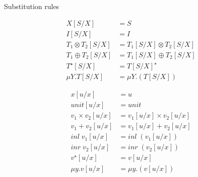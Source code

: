 \documentclass[10pt]{jsarticle}
\begin{document}
\begin{itembox}[c]{Substitution rules}
  \begin{minipage}{0.5\hsize}
    \begin{align*}
      X[S/X] &= S \\
      I[S/X] &= I \\
      T_1\otimes{}T_2[S/X] &= T_1[S/X]\otimes{}T_2[S/X] \\
      T_1\oplus{}T_2[S/X] &= T_1[S/X]\oplus{}T_2[S/X] \\
      T^\star[S/X] &= T[S/X]^\star \\
      \mu{Y}.T[S/X] &= \mu{Y}.(T[S/X])
    \end{align*}
  \end{minipage}
  \begin{minipage}{0.5\hsize}
    \begin{align*}
    x[u/x] &= u \\
    unit[u/x] &= unit \\
    v_1\times{}v_2[u/x] &= v_1[u/x]\times{}v_2[u/x] \\
    v_1+v_2[u/x] &= v_1[u/x]+v_2[u/x] \\
    inl\;v_1[u/x] &= inl\;(v_1[u/x]) \\
    inr\;v_2[u/x] &= inr\;(v_2[u/x]) \\
    v^\star[u/x] &= v[u/x] \\
    \mu{y}.v[u/x] &= \mu{y}.(v[u/x])
    \end{align*}
  \end{minipage}
\end{itembox}
\end{document}
